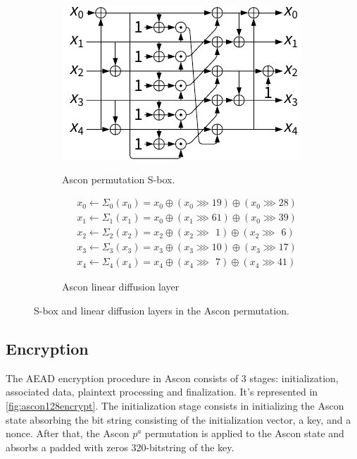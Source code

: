 \documentclass[11pt,twoside]{article}
\begin{document}
\begin{figure}
  \centering
  \begin{subfigure}[b]{0.4\textwidth}
    \includegraphics[scale=1]{assets/sbox.pdf} \\
    \caption{Ascon permutation S-box.}
    \label{fig:asconsbox}
  \end{subfigure}
  \hspace*{0.01\textwidth}
  \begin{subfigure}[B]{0.55\textwidth}
    \begin{align*}
       & x_0 \leftarrow \Sigma_{0}(x_0) = x_0 \oplus (x_0 \ggg 19) \oplus (x_0 \ggg 28)          \\
       & x_1 \leftarrow \Sigma_{1}(x_1) = x_0 \oplus (x_1 \ggg 61) \oplus (x_0 \ggg 39)          \\
       & x_2 \leftarrow \Sigma_{2}(x_2) = x_2 \oplus (x_2 \ggg \ \, 1) \oplus (x_2 \ggg \ \,  6) \\
       & x_3 \leftarrow \Sigma_{3}(x_3) = x_3 \oplus (x_3 \ggg 10) \oplus (x_3 \ggg 17)          \\
       & x_4 \leftarrow \Sigma_{4}(x_4) = x_4 \oplus (x_4 \ggg \ \,  7) \oplus (x_4 \ggg 41)
    \end{align*}
    \vspace*{0.07\textwidth}
    \caption{Ascon linear diffusion layer}
    \label{fig:asconlineardiffusion}
  \end{subfigure}
  \caption{S-box and linear diffusion layers in the Ascon permutation.}
  \label{fig:2}
\end{figure}



\subsection{Encryption}
The AEAD encryption procedure in Ascon consists of 3 stages: initialization, associated data, plaintext processing and finalization. It's represented in \cref{fig:ascon128encrypt}. The initialization stage consists in initializing the Ascon state absorbing the bit string consisting of the initialization vector, a key, and a nonce. After that, the Ascon $p^a$  permutation is applied to the Ascon state and absorbs a padded with zeros 320-bitstring of the key.
\end{document}
